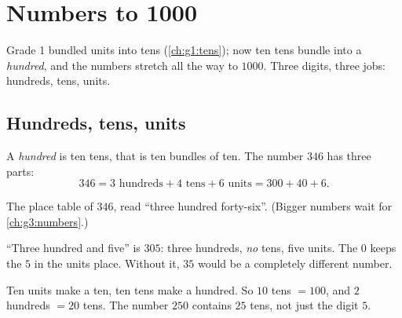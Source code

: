 \chapter{Numbers to 1000}\label{ch:g2:numbers}

Grade 1 bundled units into tens (\cref{ch:g1:tens}); now ten tens
bundle into a \emph{hundred}, and the numbers stretch all the way to
$1000$. Three digits, three jobs: hundreds, tens, units.

\section{Hundreds, tens, units}

\begin{definition}\label{def:g2:numbers:places}
A \emph{hundred} is ten tens, that is ten bundles of ten. The
number $346$ has three parts:
\[
346 = 3 \text{ hundreds} + 4 \text{ tens} + 6 \text{ units}
= 300 + 40 + 6 .
\]
\end{definition}

\begin{omfigure}

{\small The place table of $346$, read ``three hundred forty-six''.
(Bigger numbers wait for \cref{ch:g3:numbers}.)}
\end{omfigure}

\begin{example}\label{ex:g2:numbers:zero}
``Three hundred and five'' is $305$: three hundreds, \emph{no}
tens, five units. The $0$ keeps the $5$ in the units place. Without
it, $35$ would be a completely different number.
\end{example}

\begin{example}[Exchanging]\label{ex:g2:numbers:exchange}
Ten units make a ten, ten tens make a hundred. So $10$ tens
$= 100$, and $2$ hundreds $= 20$ tens. The number $250$ contains
$25$ tens, not just the digit $5$.
\end{example}

